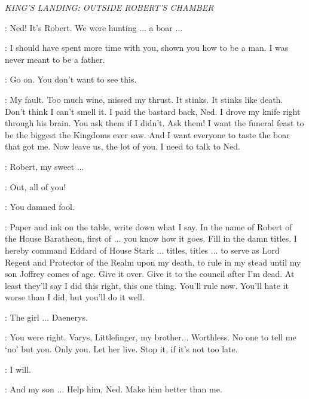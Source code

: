 \scene

\textit{KING'S LANDING: OUTSIDE ROBERT'S CHAMBER} 


\RENLY: Ned! It's Robert. We were hunting $\ldots$ a boar $\ldots$ 


\ROBERT:  I should have spent more time with you, shown you how to be a man. I was never meant to be a father.


\ROBERT:  Go on. You don't want to see this.


\ROBERT:  My fault. Too much wine, missed my thrust. It stinks. It stinks like death. Don't think I can't smell it. I paid the bastard back, Ned. I drove my knife right through his brain. You ask them if I didn't. Ask them! I want the funeral feast to be the biggest the Kingdoms ever saw. And I want everyone to taste the boar that got me. Now leave us, the lot of you. I need to talk to Ned. 

\CERSEI: Robert, my sweet $\ldots$ 

\ROBERT: Out, all of you! 


\NED: You damned fool. 

\ROBERT: Paper and ink on the table, write down what I say. In the name of Robert of the House Baratheon, first of $\ldots$ you know how it goes. Fill in the damn titles. I hereby command Eddard of House Stark $\ldots$ titles, titles $\ldots$ to serve as Lord Regent and Protector of the Realm upon my death, to rule in my stead until my son Joffrey comes of age. Give it over. Give it to the council after I'm dead. At least they'll say I did this right, this one thing. You'll rule now. You'll hate it worse than I did, but you'll do it well. 

\NED: The girl $\ldots$ Daenerys. 

\ROBERT: You were right. Varys, Littlefinger, my brother$\ldots$ Worthless. No one to tell me `no' but you. Only you. Let her live. Stop it, if it's not too late. 

\NED: I will. 

\ROBERT: And my son $\ldots$ Help him, Ned. Make him better than me. 

